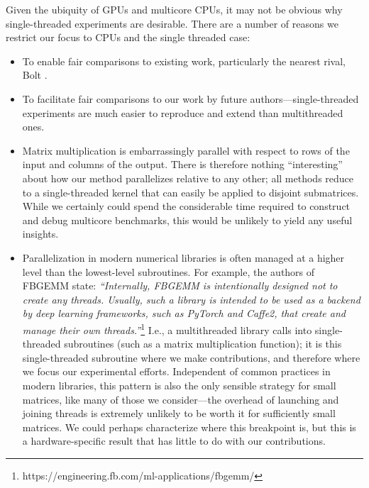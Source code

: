 Given the ubiquity of GPUs and multicore CPUs, it may not be obvious why single-threaded experiments are desirable. There are a number of reasons we restrict our focus to CPUs and the single threaded case:
\begin{itemize}
    \item To enable fair comparisons to existing work, particularly the nearest rival, Bolt \cite{bolt}.
    \item To facilitate fair comparisons to our work by future authors---single-threaded experiments are much easier to reproduce and extend than multithreaded ones.
    \item Matrix multiplication is embarrassingly parallel with respect to rows of the input and columns of the output. There is therefore nothing ``interesting'' about how our method parallelizes relative to any other; all methods reduce to a single-threaded kernel that can easily be applied to disjoint submatrices. While we certainly could spend the considerable time required to construct and debug multicore benchmarks, this would be unlikely to yield any useful insights.
    \item Parallelization in modern numerical libraries is often managed at a higher level than the lowest-level subroutines. For example, the authors of FBGEMM \cite{fbgemm} state: \textit{``Internally, FBGEMM is intentionally designed not to create any threads. Usually, such a library is intended to be used as a backend by deep learning frameworks, such as PyTorch and Caffe2, that create and manage their own threads.''}\footnote{https://engineering.fb.com/ml-applications/fbgemm/} I.e., a multithreaded library calls into single-threaded subroutines (such as a matrix multiplication function); it is this single-threaded subroutine where we make contributions, and therefore where we focus our experimental efforts. Independent of common practices in modern libraries, this pattern is also the only sensible strategy for small matrices, like many of those we consider---the overhead of launching and joining threads is extremely unlikely to be worth it for sufficiently small matrices. We could perhaps characterize where this breakpoint is, but this is a hardware-specific result that has little to do with our contributions.

\end{itemize}
